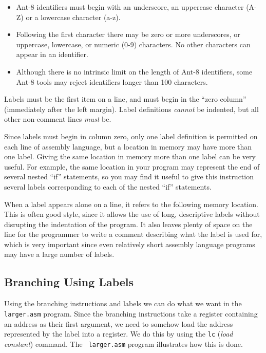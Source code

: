 \begin{itemize}

\item {\sc Ant-8} identifiers must begin with an underscore, an uppercase
	character (A-Z) or a lowercase character (a-z).

\item Following the first character there may be zero or more
	underscores, or uppercase, lowercase, or numeric (0-9)
	characters.  No other characters can appear in an identifier.

\item Although there is no intrinsic limit on the length of {\sc Ant-8}
	identifiers, some {\sc Ant-8} tools may reject identifiers longer than
	100 characters.

\end{itemize}


Labels must be the first item on a line, and must begin in the ``zero
column'' (immediately after the left margin).  Label definitions {\em
cannot} be indented, but all other non-comment lines {\em must} be.

Since labels must begin in column zero, only one label definition is
permitted on each line of assembly language, but a location in memory
may have more than one label.  Giving the same location in memory more
than one label can be very useful.  For example, the same location in
your program may represent the end of several nested ``if''
statements, so you may find it useful to give this instruction several
labels corresponding to each of the nested ``if'' statements.

When a label appears alone on a line, it refers to the following
memory location.  This is often good style, since it allows the use of
long, descriptive labels without disrupting the indentation of the
program.  It also leaves plenty of space on the line for the
programmer to write a comment describing what the label is used for,
which is very important since even relatively short assembly language
programs may have a large number of labels.

\subsection{Branching Using Labels}

Using the branching instructions and labels we can do what we want in
the {\tt larger.asm} program.  Since the branching instructions take a
register containing an address as their first argument, we need to
somehow load the address represented by the label into a register.  We
do this by using the {\tt lc} ({\em load constant}) command.  The {\tt
larger.asm} program illustrates how this is done.

